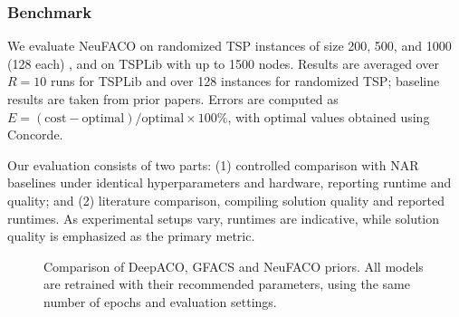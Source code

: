 \documentclass[a4paper,conference]{IEEEtran}
\begin{document}
\subsubsection{Benchmark}We evaluate NeuFACO on randomized TSP instances of size 200, 500, and 1000 (128 each) \cite{DeepACO}, and on TSPLib \cite{tsplib} with up to 1500 nodes. Results are averaged over $R=10$ runs for TSPLib and over 128 instances for randomized TSP; baseline results are taken from prior papers. Errors are computed as $E=(\text{cost}-\text{optimal})/\text{optimal}\times100\%$, with optimal values obtained using Concorde.  

Our evaluation consists of two parts: (1) controlled comparison with NAR baselines under identical hyperparameters and hardware, reporting runtime and quality; and (2) literature comparison, compiling solution quality and reported runtimes. As experimental setups vary, runtimes are indicative, while solution quality is emphasized as the primary metric.

\begin{figure}[!htb]
  \centering


  \caption{Comparison of DeepACO, GFACS and NeuFACO priors. All models are retrained with their recommended parameters, using the same number of epochs and evaluation settings.}
  \label{fig:NAR}
\end{figure}
\end{document}
